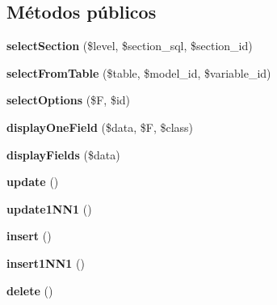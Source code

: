 \subsection*{Métodos públicos}
\begin{DoxyCompactItemize}
\item 
\mbox{\label{classadminblock_a5a9c45c8bdb32b8cb34341c0651e8970}} 
{\bfseries select\+Section} (\$level, \$section\+\_\+sql, \$section\+\_\+id)
\item 
\mbox{\label{classadminblock_a799a5af3e9759b2a1b6f110940fd03cf}} 
{\bfseries select\+From\+Table} (\$table, \$model\+\_\+id, \$variable\+\_\+id)
\item 
\mbox{\label{classadminblock_a37317b2ea7f1da508d561befcc232af7}} 
{\bfseries select\+Options} (\$F, \$id)
\item 
\mbox{\label{classadminblock_ada80fd6066d96b488861e47485db043f}} 
{\bfseries display\+One\+Field} (\$data, \$F, \$class)
\item 
\mbox{\label{classadminblock_a7bb1e8f357803f17830becbd417588ae}} 
{\bfseries display\+Fields} (\$data)
\item 
\mbox{\label{classadminblock_a2aaea9bf7d5956dfb59322a7009b2538}} 
{\bfseries update} ()
\item 
\mbox{\label{classadminblock_ab7be1803fca03951754c864962aa072d}} 
{\bfseries update1\+N\+N1} ()
\item 
\mbox{\label{classadminblock_a6c3808e99afabab0fb51663ea7a972a4}} 
{\bfseries insert} ()
\item 
\mbox{\label{classadminblock_a85f955923111d4f0096b183a35bd10f2}} 
{\bfseries insert1\+N\+N1} ()
\item 
\mbox{\label{classadminblock_a7951b7fba32a86503b434b99b926b16c}} 
{\bfseries delete} ()
\item 
\mbox{\label{classadminblock_a410e2d751c1c7237f844d5e8f58e8fb6}} 

\end{DoxyCompactItemize}
